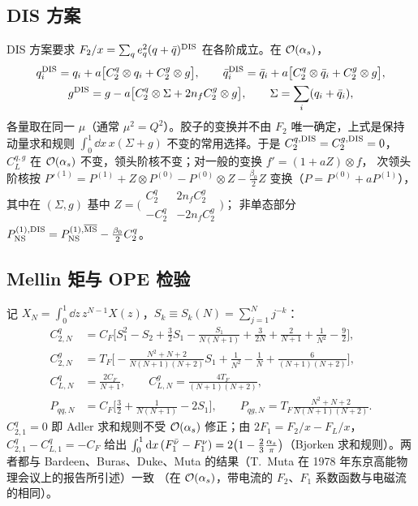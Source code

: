 \subsection{DIS 方案}

DIS 方案要求 $F_2/x=\sum_qe_q^2(q+\bar q)^{\rm DIS}$ 在各阶成立。在 $\mathcal{O}\!\left(\alpha_s\right)$，
\begin{gather}
q_i^{\rm DIS}=q_i+a\big[C_2^q\otimes q_i+C_2^g\otimes g\big],\qquad
\bar q_i^{\rm DIS}=\bar q_i+a\big[C_2^q\otimes\bar q_i+C_2^g\otimes g\big],\nonumber\\
g^{\rm DIS}=g-a\big[C_2^q\otimes\Sigma+2n_fC_2^g\otimes g\big],\qquad \Sigma=\sum_i(q_i+\bar q_i),
\label{eq:dis1l-DIS}
\end{gather}
各量取在同一 $\mu$（通常 $\mu^2=Q^2$）。胶子的变换并不由 $F_2$ 唯一确定，上式是保持动量求和规则
$\int_0^1\dd x\,x(\Sigma+g)$ 不变的常用选择。于是 $C_2^{q,\rm DIS}=C_2^{g,\rm DIS}=0$，
$C_L^{q,g}$ 在 $\mathcal{O}\!\left(\alpha_s\right)$ 不变，领头阶核不变；对一般的变换 $f'=(1+aZ)\otimes f$，
次领头阶核按 $P'^{(1)}=P^{(1)}+Z\otimes P^{(0)}-P^{(0)}\otimes Z-\frac{\beta_0}{2}Z$ 变换（$P=P^{(0)}+aP^{(1)}$），
其中在 $(\Sigma,g)$ 基中 $Z=\bigl(\begin{smallmatrix}C_2^q&2n_fC_2^g\\-C_2^q&-2n_fC_2^g\end{smallmatrix}\bigr)$；
非单态部分 $P^{(1),\rm DIS}_{\rm NS}=P^{(1),\overline{\mathrm{MS}}}_{\rm NS}-\frac{\beta_0}{2}C_2^q$。

\subsection{Mellin 矩与 OPE 检验}

记 $X_N=\int_0^1\dd z\,z^{N-1}X(z)$，$S_k\equiv S_k(N)=\sum_{j=1}^Nj^{-k}$：
\begin{align}
C^q_{2,N}&=C_F\Big[S_1^2-S_2+\frac32S_1-\frac{S_1}{N(N+1)}+\frac{3}{2N}+\frac{2}{N+1}+\frac{1}{N^2}-\frac92\Big],\label{eq:dis1l-C2qN}\\
C^g_{2,N}&=T_F\Big[-\frac{N^2+N+2}{N(N+1)(N+2)}S_1+\frac{1}{N^2}-\frac{1}{N}+\frac{6}{(N+1)(N+2)}\Big],\label{eq:dis1l-C2gN}\\
C^q_{L,N}&=\frac{2C_F}{N+1},\qquad C^g_{L,N}=\frac{4T_F}{(N+1)(N+2)},\nonumber\\
P_{qq,N}&=C_F\Big[\frac32+\frac{1}{N(N+1)}-2S_1\Big],\qquad P_{qg,N}=T_F\frac{N^2+N+2}{N(N+1)(N+2)}.\nonumber
\end{align}
$C^q_{2,1}=0$ 即 Adler 求和规则不受 $\mathcal{O}\!\left(\alpha_s\right)$ 修正；由 $2F_1=F_2/x-F_L/x$，$C^q_{2,1}-C^q_{L,1}=-C_F$ 给出
$\int_0^1\mathrm{d} x\,(F_1^{\bar\nu}-F_1^{\nu})=2\big(1-\frac23\frac{\alpha_s}{\pi}\big)$（Bjorken 求和规则）。两者都与
Bardeen、Buras、Duke、Muta 的结果（T.~Muta 在 1978 年东京高能物理会议上的报告所引述）一致
（在 $\mathcal{O}\!\left(\alpha_s\right)$，带电流的 $F_2$、$F_1$ 系数函数与电磁流的相同）。

